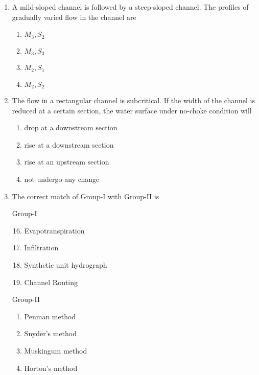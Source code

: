 \documentclass[journal]{IEEEtran}
\begin{document}
\begin{enumerate}
    \item A mild-sloped channel is followed by a steep-sloped channel. The profiles of gradually
    varied flow in the channel are  

        \begin{multicols}{4}
            \begin{enumerate}
                \item $M_3, S_2$
                \item $M_3, S_3$
                \item $M_2, S_1$
                \item $M_2, S_2$
            \end{enumerate}
        \end{multicols}

    \item The flow in a rectangular channel is subcritical. If the width of the channel is reduced
    at a certain section, the water surface under no-choke condition will  

        \begin{multicols}{2}
            \begin{enumerate}
                \item drop at a downstream section
                \item rise at a downstream section
                \item rise at an upstream section
                \item not undergo any change
            \end{enumerate}
        \end{multicols}
       
    \item The correct match of Group-I with Group-II is
        \begin{multicols}{2}
            Group-I
            \begin{enumerate}[label={\Alph*.}]
                \setcounter{enumii}{15}
                \item Evapotranspiration
                \item Infiltration
                \item Synthetic unit hydrograph
                \item Channel Routing
            \end{enumerate}
            \columnbreak
            Group-II
            \begin{enumerate}[label={\arabic*.}]
                \item Penman method
                \item Snyder's method
                \item Muskingum method
                \item Horton's method
            \end{enumerate}
        \end{multicols}


\end{enumerate}
\end{document}
